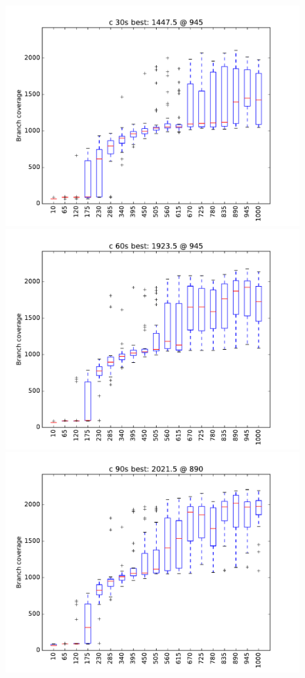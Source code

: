 \begin{figure}
\includegraphics[width=\columnwidth]{graphs/Crand30}
\includegraphics[width=\columnwidth]{graphs/Crand60}
\includegraphics[width=\columnwidth]{graphs/Crand90}
\end{figure}

